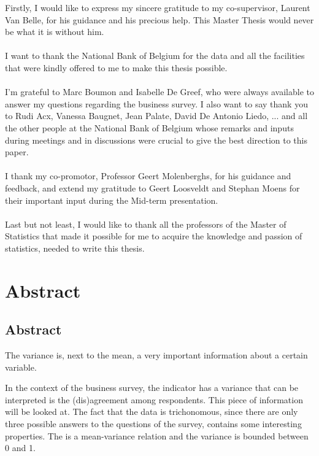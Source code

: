\documentclass[12pt,a4paper,oneside]{book}
\begin{document}
Firstly, I would like to express my sincere gratitude to my co-supervisor, Laurent Van Belle, for his guidance and his precious help. This Master Thesis would never be what it is without him. \\~\\ 

I want to thank the National Bank of Belgium for the data and all the facilities that were kindly offered to me to make this thesis possible. \\~\\

I'm grateful to Marc Boumon and Isabelle De Greef, who were always available to answer my questions regarding the business survey. 
I also want to say thank you to Rudi Acx, Vanessa Baugnet, Jean Palate, David De Antonio Liedo, ... and all the other people at the National Bank of Belgium whose remarks and inputs during meetings and in discussions were crucial to give the best direction to this paper. \\~\\

I thank my co-promotor, Professor Geert Molenberghs, for his guidance and feedback, and extend my gratitude to Geert Loosveldt and Stephan Moens for their important input during the Mid-term presentation. \\~\\

Last but not least, I would like to thank all the professors of the Master of Statistics that made it possible for me to acquire the knowledge and passion of statistics, needed to write this thesis. 


\chapter*{Abstract}


\section*{Abstract}

The variance is, next to the mean, a very important information about a certain variable.

In the context of the business survey, the indicator has a variance that can be interpreted is the (dis)agreement among respondents.
This piece of information will be looked at. The fact that the data is trichonomous, since there are only three possible answers to the questions of the survey, contains some interesting properties. 
The is a mean-variance relation and the variance is bounded between 0 and 1.
\end{document}
